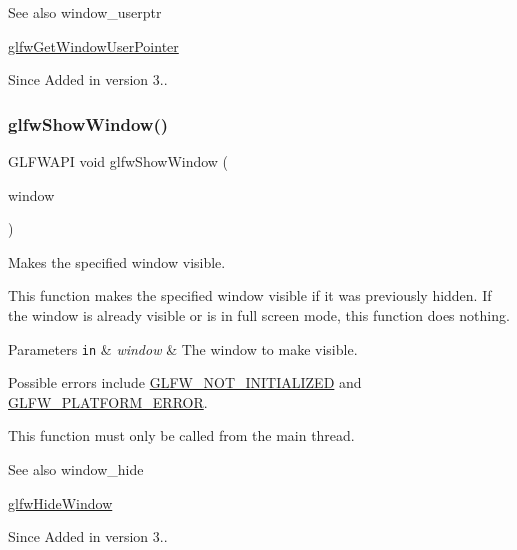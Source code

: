 \begin{DoxySeeAlso}{See also}
window\+\_\+userptr 

\hyperlink{group__window_ga0a9ff3b4bf8589e9518e8816d06a8f50}{glfw\+Get\+Window\+User\+Pointer}
\end{DoxySeeAlso}
\begin{DoxySince}{Since}
Added in version 3.. 
\end{DoxySince}
\mbox{\label{group__window_ga7945bcdff9e5e058cf36505d6873ed8c}} 
\subsubsection{\texorpdfstring{glfw\+Show\+Window()}{glfwShowWindow()}}
{\footnotesize\ttfamily G\+L\+F\+W\+A\+PI void glfw\+Show\+Window (\begin{DoxyParamCaption}\item[{\hyperlink{group__window_ga3c96d80d363e67d13a41b5d1821f3242}{G\+L\+F\+Wwindow} $\ast$}]{window }\end{DoxyParamCaption})}



Makes the specified window visible. 

This function makes the specified window visible if it was previously hidden. If the window is already visible or is in full screen mode, this function does nothing.


\begin{DoxyParams}[1]{Parameters}
\mbox{\tt in}  & {\em window} & The window to make visible.\\
\hline
\end{DoxyParams}
Possible errors include \hyperlink{group__errors_ga2374ee02c177f12e1fa76ff3ed15e14a}{G\+L\+F\+W\+\_\+\+N\+O\+T\+\_\+\+I\+N\+I\+T\+I\+A\+L\+I\+Z\+ED} and \hyperlink{group__errors_gad44162d78100ea5e87cdd38426b8c7a1}{G\+L\+F\+W\+\_\+\+P\+L\+A\+T\+F\+O\+R\+M\+\_\+\+E\+R\+R\+OR}.

This function must only be called from the main thread.

\begin{DoxySeeAlso}{See also}
window\+\_\+hide 

\hyperlink{group__window_gaa17e287d521544bdeceafa09ac036e20}{glfw\+Hide\+Window}
\end{DoxySeeAlso}
\begin{DoxySince}{Since}
Added in version 3.. 
\end{DoxySince}
\mbox{\label{group__window_gafb827800eedbfcbc97b1e5408df668d7}} 
